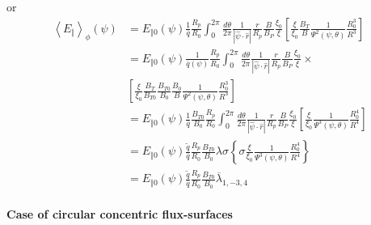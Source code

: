 or
\begin{align}
\left\langle E_{\Vert}\right\rangle _{\phi}\left( \psi\right) & =E_{\Vert
0}\left( \psi\right) \frac{1}{\overline{q}}\frac{R_{p}}{R_{0}}\int_{0}^{2\pi}%
\frac{d\theta}{2\pi}\frac{1}{\left| \widehat{\psi}\cdot\widehat {r}\right| }%
\frac{r}{R_{p}}\frac{B}{B_{P}}\frac{\xi_{0}}{\xi}\left[ \frac{\xi}{\xi_{0}}%
\frac{B_{T}}{B}\frac{1}{\Psi^{2}\left( \psi,\theta\right) }\frac{R_{0}^{3}}{
R^{3}}\right]  \nonumber \\
& =E_{\Vert0}\left( \psi\right) \frac{1}{\overline{q}\left( \psi\right) }%
\frac{R_{p}}{R_{0}}\int_{0}^{2\pi}\frac{d\theta}{2\pi}\frac{1}{\left|
\widehat{\psi}\cdot\widehat{r}\right| }\frac{r}{R_{p}}\frac{B}{B_{P}}\frac{
\xi_{0}}{\xi}\times  \nonumber \\
& \left[ \frac{\xi}{\xi_{0}}\frac{B_{T}}{B_{T0}}\frac{B_{T0}}{B_{0}}\frac{
B_{0}}{B}\frac{1}{\Psi^{2}\left( \psi,\theta\right) }\frac{R_{0}^{3}}{R^{3}}
\right]  \nonumber \\
& =E_{\Vert0}\left( \psi\right) \frac{1}{\overline{q}}\frac{B_{T0}}{B_{0}}%
\frac{R_{p}}{R_{0}}\int_{0}^{2\pi}\frac{d\theta}{2\pi}\frac{1}{\left|
\widehat{\psi}\cdot\widehat{r}\right| }\frac{r}{R_{p}}\frac{B}{B_{P}}\frac{
\xi_{0}}{\xi}\left[ \frac{\xi}{\xi_{0}}\frac{1}{\Psi^{3}\left(
\psi,\theta\right) }\frac{R_{0}^{4}}{R^{4}}\right]  \nonumber \\
& =E_{\Vert0}\left( \psi\right) \frac{\widetilde{q}}{\overline{q}}\frac{R_{p}%
}{R_{0}}\frac{B_{T0}}{B_{0}}\lambda\sigma\left\{ \sigma\frac{\xi }{\xi_{0}}%
\frac{1}{\Psi^{3}\left( \psi,\theta\right) }\frac{R_{0}^{4}}{R^{4}}\right\}
\nonumber \\
& =E_{\Vert0}\left( \psi\right) \frac{\widetilde{q}}{\overline{q}}\frac{R_{p}%
}{R_{0}}\frac{B_{T0}}{B_{0}}\overline{\lambda}_{1,-3,4}
\end{align}

\paragraph{Case of circular concentric flux-surfaces}

